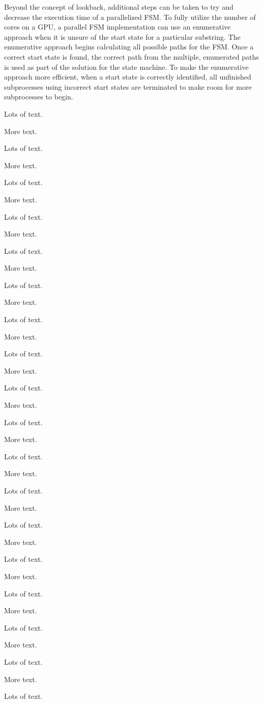 \documentclass{sigplanconf}
\begin{document}
Beyond the concept of lookback, additional steps can be taken to try and decrease the execution time of a parallelized FSM. To fully utilize the number of cores on a GPU, a parallel FSM implementation can use an enumerative approach when it is unsure of the start state for a particular substring. The enumerative approach begins calculating all possible paths for the FSM. Once a correct start state is found, the correct path from the multiple, enumerated paths is used as part of the solution for the state machine. To make the enumerative approach more efficient, when a start state is correctly identified, all unfinished subprocesses using incorrect start states are terminated to make room for more subprocesses to begin.

Lots of text.

More text.

Lots of text.

More text.


Lots of text.

More text.

Lots of text.

More text.


Lots of text.

More text.

Lots of text.

More text.

Lots of text.

More text.

Lots of text.

More text.

Lots of text.

More text.

Lots of text.

More text.

Lots of text.

More text.

Lots of text.

More text.

Lots of text.

More text.

Lots of text.

More text.


Lots of text.

More text.

Lots of text.

More text.


Lots of text.

More text.

Lots of text.
\end{document}
